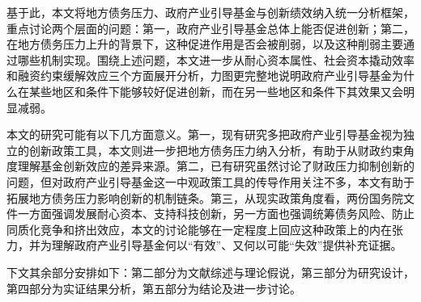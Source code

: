 基于此，本文将地方债务压力、政府产业引导基金与创新绩效纳入统一分析框架，重点讨论两个层面的问题：第一，政府产业引导基金总体上能否促进创新；第二，在地方债务压力上升的背景下，这种促进作用是否会被削弱，以及这种削弱主要通过哪些机制实现。围绕上述问题，本文进一步从耐心资本属性、社会资本撬动效率和融资约束缓解效应三个方面展开分析，力图更完整地说明政府产业引导基金为什么在某些地区和条件下能够较好促进创新，而在另一些地区和条件下其效果又会明显减弱。

本文的研究可能有以下几方面意义。第一，现有研究多把政府产业引导基金视为独立的创新政策工具，本文则进一步把地方债务压力纳入分析，有助于从财政约束角度理解基金创新效应的差异来源。第二，已有研究虽然讨论了财政压力抑制创新的问题，但对政府产业引导基金这一中观政策工具的传导作用关注不多，本文有助于拓展地方债务压力影响创新的机制链条。第三，从现实政策角度看，两份国务院文件一方面强调发展耐心资本、支持科技创新，另一方面也强调统筹债务风险、防止同质化竞争和挤出效应，本文的讨论能够在一定程度上回应这种政策上的内在张力，并为理解政府产业引导基金何以“有效”、又何以可能“失效”提供补充证据。

下文其余部分安排如下：第二部分为文献综述与理论假说，第三部分为研究设计，第四部分为实证结果分析，第五部分为结论及进一步讨论。